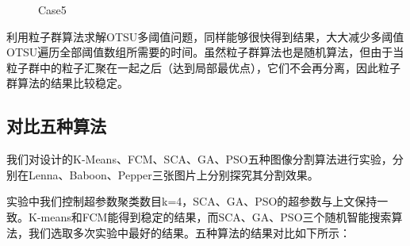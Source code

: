 \documentclass{article}
\begin{document}
\begin{figure}[h]
\begin{minipage}[t]{0.2\textwidth}
		\caption{Case5}
	\end{minipage}
\end{figure}

利用粒子群算法求解OTSU多阈值问题，同样能够很快得到结果，大大减少多阈值OTSU遍历全部阈值数组所需要的时间。虽然粒子群算法也是随机算法，但由于当粒子群中的粒子汇聚在一起之后（达到局部最优点），它们不会再分离，因此粒子群算法的结果比较稳定。

\subsection{对比五种算法}
我们对设计的K-Means、FCM、SCA、GA、PSO五种图像分割算法进行实验，分别在Lenna、Baboon、Pepper三张图片上分别探究其分割效果。

实验中我们控制超参数聚类数目k=4，SCA、GA、PSO的超参数与上文保持一致。K-means和FCM能得到稳定的结果，而SCA、GA、PSO三个随机智能搜索算法，我们选取多次实验中最好的结果。五种算法的结果对比如下所示：

\end{document}

